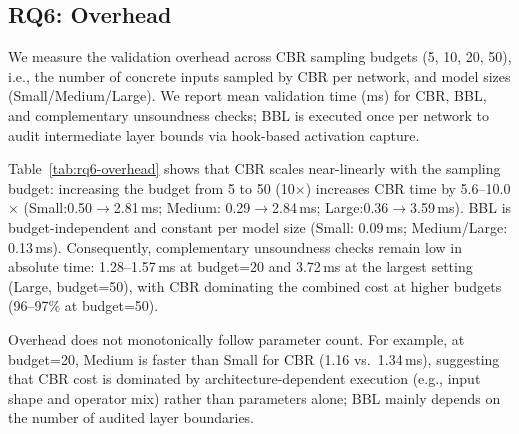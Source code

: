 \subsection{RQ6: Overhead}

We measure the validation overhead across CBR sampling budgets (5, 10, 20, 50), i.e., the number of concrete inputs sampled by CBR per network, and model sizes (Small/Medium/Large). We report mean validation time (ms) for CBR, BBL, and complementary unsoundness checks; BBL is executed once per network to audit intermediate layer bounds via hook-based activation capture.

Table~\ref{tab:rq6-overhead} shows that CBR scales near-linearly with the sampling budget: increasing the budget from 5 to 50 (10$\times$) increases CBR time by 5.6--10.0$\times$ (Small:0.50$\rightarrow$2.81\,ms; Medium: 0.29$\rightarrow$2.84\,ms; Large:0.36$\rightarrow$3.59\,ms). BBL is budget-independent and constant per model size (Small: 0.09\,ms; Medium/Large: 0.13\,ms). Consequently, complementary unsoundness checks remain low in absolute time: 1.28--1.57\,ms at budget=20 and 3.72\,ms at the largest setting (Large, budget=50), with CBR dominating the combined cost at higher budgets (96--97\% at budget=50).


Overhead does not monotonically follow parameter count. For example, at budget=20, Medium is faster than Small for CBR (1.16 vs.\ 1.34\,ms), suggesting that CBR cost is dominated by architecture-dependent execution (e.g., input shape and operator mix) rather than parameters alone; BBL mainly depends on the number of audited layer boundaries.
